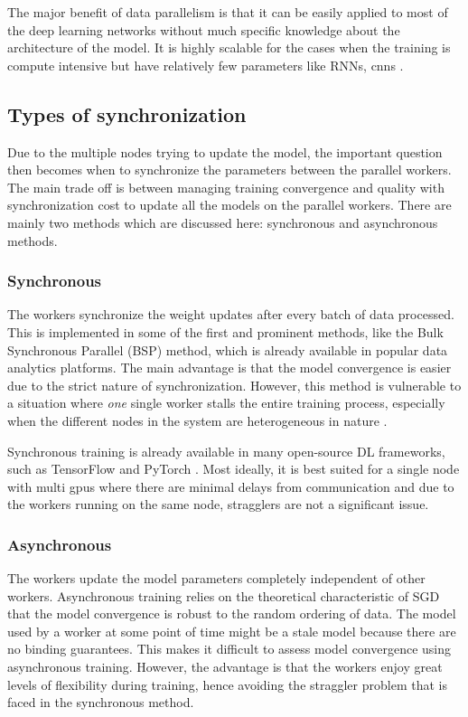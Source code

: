 The major benefit of data parallelism is that it can be easily applied to most of the deep learning networks without much specific knowledge about the architecture of the model. It is highly scalable for the cases when the training is compute intensive but have relatively few parameters like RNNs, \acrshort{cnn}s \cite{Krizhevsky2014OneNetworks}.


\subsection{Types of synchronization}
Due to the multiple nodes trying to update the model, the important question then becomes when to synchronize the parameters between the parallel workers. The main trade off is between managing training convergence and quality with synchronization cost to update all the models on the parallel workers. There are mainly two methods which are discussed here: synchronous and asynchronous methods.

\subsubsection{Synchronous}
The workers synchronize the weight updates after every batch of data processed. This is implemented in some of the first and prominent methods, like the Bulk Synchronous Parallel (BSP) \cite{Valiant1990AComputation} method, which is already available in popular data analytics platforms. The main advantage is that the model convergence is easier due to the strict nature of synchronization. However, this method is vulnerable to a situation where \emph{one} single worker stalls the entire training process, especially when the different nodes in the system are heterogeneous in nature \cite{Cipar2013SolvingStaleness}.

Synchronous training is already available in many open-source DL frameworks, such
as TensorFlow \cite{Abadi2016TensorFlow:Systems} and PyTorch \cite{Paszke2019PyTorch:Library}. Most ideally, it is best suited for a single node with multi \acrshort{gpu}s where there are minimal delays from communication and due to the workers running on the same node, stragglers are not a significant issue.

\subsubsection{Asynchronous}
\label{section:hogwild}
The workers update the model parameters completely independent of other workers. Asynchronous training relies on the theoretical characteristic of SGD that the model convergence is robust to the random ordering of data. The model used by a worker at some point of time might be a stale model because there are no binding guarantees. This makes it difficult to assess model convergence using asynchronous training. However, the advantage is that the workers enjoy great levels of flexibility during training, hence avoiding the straggler problem that is faced in the synchronous method.

